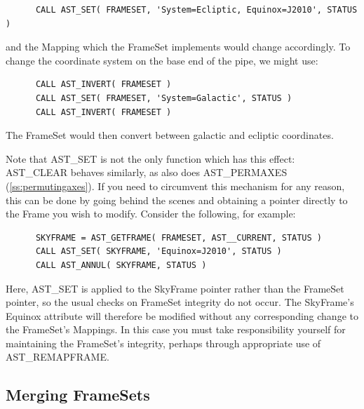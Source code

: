 \documentclass[twoside,11pt]{article}
\newcommand{\htmlref}[2]{#1}
\newcommand{\secref}[1]{\S\ref{#1}}
\renewcommand{\secref}[1]{\ref{#1}}
\begin{document}
\small
\begin{verbatim}
      CALL AST_SET( FRAMESET, 'System=Ecliptic, Equinox=J2010', STATUS )
\end{verbatim}
\normalsize

and the Mapping which the FrameSet implements would change
accordingly. To change the coordinate system on the base end of the
pipe, we might use:

\small
\begin{verbatim}
      CALL AST_INVERT( FRAMESET )
      CALL AST_SET( FRAMESET, 'System=Galactic', STATUS )
      CALL AST_INVERT( FRAMESET )
\end{verbatim}
\normalsize

The FrameSet would then convert between galactic and ecliptic
coordinates.

Note that AST\_SET is not the only function which has this effect:
\htmlref{AST\_CLEAR}{AST_CLEAR} behaves similarly, as also does \htmlref{AST\_PERMAXES}{AST_PERMAXES}
(\secref{ss:permutingaxes}). If you need to circumvent this mechanism
for any reason, this can be done by going behind the scenes and
obtaining a pointer directly to the Frame you wish to modify. Consider
the following, for example:

\small
\begin{verbatim}
      SKYFRAME = AST_GETFRAME( FRAMESET, AST__CURRENT, STATUS )
      CALL AST_SET( SKYFRAME, 'Equinox=J2010', STATUS )
      CALL AST_ANNUL( SKYFRAME, STATUS )
\end{verbatim}
\normalsize

Here, AST\_SET is applied to the SkyFrame pointer rather than the
FrameSet pointer, so the usual checks on FrameSet integrity do not
occur. The SkyFrame's Equinox attribute will therefore be modified
without any corresponding change to the FrameSet's Mappings.  In this
case you must take responsibility yourself for maintaining the
FrameSet's integrity, perhaps through appropriate use of
AST\_REMAPFRAME.

\subsection{Merging FrameSets}
\end{document}
